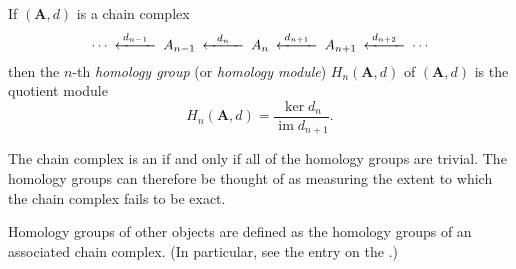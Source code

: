\documentclass[12pt]{article}
\newcommand{\im}{\operatorname{im}}
\begin{document}

If $(\mathbf{A},d)$ is a chain complex 
$$\begin{CD}
\cdots@<{d_{n-1}}<<A_{n-1} @<{d_{n}}<< A_n@<{d_{n+1}}<< A_{n+1} @<{d_{n+2}}<<\cdots
\end{CD}$$
then the $n$-th \emph{homology group} (or \emph{homology module})
$H_n(\mathbf{A},d)$ of $(\mathbf{A},d)$
is the quotient module
\[
H_n(\mathbf{A},d)=\frac{\ker d_n}{\im d_{n+1}}.
\]

The chain complex is an  if and only if
all of the homology groups are trivial.
The homology groups can therefore be thought of
as measuring the extent to which the chain complex fails to be exact.

Homology groups of other objects are defined as the homology groups of an associated chain complex. (In particular, see the entry on the .)

\end{document}

